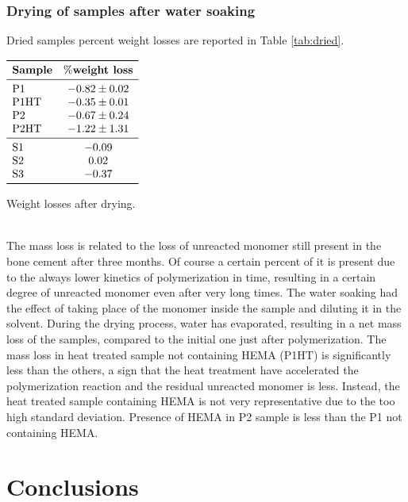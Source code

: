\documentclass[a4paper, 11pt]{article}
\begin{document}
\subsubsection{Drying of samples after water soaking}

Dried samples percent weight losses are reported in Table \ref{tab:dried}. 
\begin{table}[htp]
\centering
$
\begin{array}{lc}
\toprule
\textbf{Sample} & \textbf{$\%$weight loss}  \\
\midrule
\text{P1} & -0.82 \pm0.02 \\
\text{P1HT} & -0.35\pm0.01 \\
\text{P2} & -0.67\pm0.24 \\
\text{P2HT} & -1.22\pm1.31 \\
\midrule
\text{S1} & -0.09 \\
\text{S2} & 0.02 \\
\text{S3} & -0.37 \\
\bottomrule
\end{array}
$
\caption{Weight losses after drying.}
\label{tab:dried}
\end{table}\\
The mass loss is related to the loss of unreacted monomer still present in the bone cement after three months. Of course a certain percent of it is present due to the always lower kinetics of polymerization in time, resulting in a certain degree of unreacted monomer even after very long times. The water soaking had the effect of taking place of the monomer inside the sample and diluting it in the solvent. During the drying process, water has evaporated, resulting in a net mass loss of the samples, compared to the initial one just after polymerization. 
The mass loss in heat treated sample not containing HEMA (P1HT) is significantly less than the others, a sign that the heat treatment have accelerated the polymerization reaction and the residual unreacted monomer is less. Instead, the heat treated sample containing HEMA is not very representative due to the too high standard deviation. Presence of HEMA in P2 sample is less than the P1 not containing HEMA. 

\section{Conclusions}
\end{document}
